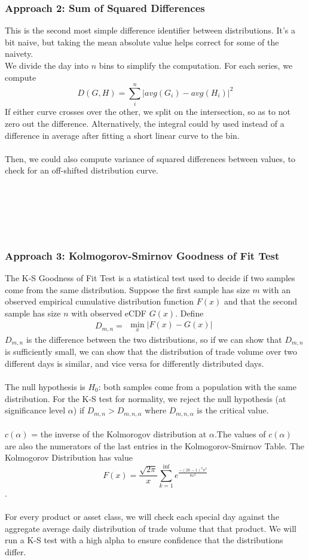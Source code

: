 \documentclass[11pt]{paper}
\begin{document}
\subsubsection*{Approach 2: Sum of Squared Differences}
This is the second most simple difference identifier between distributions. It's a bit naive, but taking the mean absolute value helps correct for some of the naivety.
\\
We divide the day into $n$ bins to simplify the computation. 
For each series, we compute 
$$D(G,H) = \sum_i^n |avg(G_i)-avg(H_i)|^2$$
If either curve crosses over the other, we split on the intersection, so as to not zero out the difference. Alternatively, the integral could by used instead of a difference in average after fitting a short linear curve to the bin.
\\\\Then, we could also compute variance of squared differences between values, to check for an off-shifted distribution curve.
\\\\\\\\\\\\
\subsubsection*{Approach 3: Kolmogorov-Smirnov Goodness of Fit Test}
The K-S Goodness of Fit Test is a statistical test used to decide if two samples come from the same distribution. Suppose the first sample has size $m$ with an observed empirical cumulative distribution function $F(x)$ and that the second sample has size $n$ with observed eCDF $G(x)$. Define
\begin{equation}D_{m,n} = 
\begin{aligned}
\min_{x} |F(x) - G(x)|
\end{aligned}
\end{equation}
$D_{m,n}$ is the difference between the two distributions, so if we can show that $D_{m,n}$ is sufficiently small, we can show that the distribution of trade volume over two different days is similar, and vice versa for differently distributed days. 
\\\\The null hypothesis is $H_0$: both samples come from a population with the same distribution. For the K-S test for normality, we reject the null hypothesis (at significance level $\alpha$) if $D_{m,n} > D_{m,n,\alpha}$ where $D_{m,n,\alpha}$ is the critical value. 
\\\\$c(\alpha)$ = the inverse of the Kolmorogov distribution at $\alpha$.The values of $c(\alpha)$ are also the numerators of the last entries in the Kolmogorov-Smirnov Table. The Kolmogorov Distribution has value $$F(x) = \frac{\sqrt{2\pi}}{x} \sum_{k=1}^{\inf} e^{\frac{-(2k-1)^2 \pi^2}{8x^2}}$$.
\\\\For every product or asset class, we will check each special day against the aggregate average daily distribution of trade volume that that product. We will run a K-S test with a high alpha to ensure confidence that the distributions differ.
\end{document}
